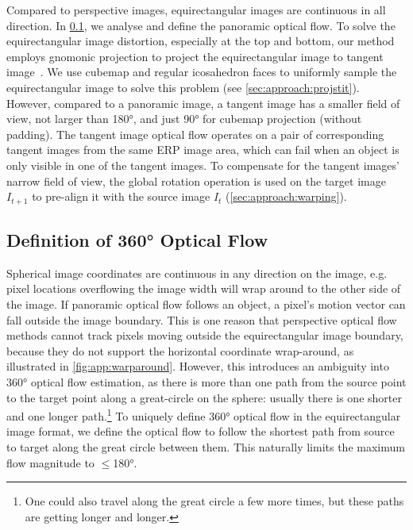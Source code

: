 Compared to perspective images, equirectangular images are continuous in all direction.
In \cref{sec:approach:definition}, we analyse and define the panoramic optical flow.
%
To solve the equirectangular image distortion, especially at the top and bottom, our method employs gnomonic projection to project the equirectangular image to tangent image~\cite{EderSLF2020}.
We use cubemap and regular icosahedron faces to uniformly sample the equirectangular image to solve this problem (see \cref{sec:approach:projstit}).
%
However, compared to a panoramic image, a tangent image has a smaller field of view, not larger than 180°, and just 90° for cubemap projection (without padding).
The tangent image optical flow operates on a pair of corresponding  tangent images from the same ERP image area,
%
which can fail when an object is only visible in one of the tangent images.
%
To compensate for the tangent images' narrow field of view, the global rotation operation is used on the target image $I_{t+1}$ to pre-align it with the source image $I_t$ (\cref{sec:approach:warping}).


\subsection{Definition of 360° Optical Flow}
\label{sec:approach:definition}

Spherical image coordinates are continuous in any direction on the image, e.g. pixel locations overflowing the image width will wrap around to the other side of the image.
%
If panoramic optical flow follows an object, a pixel's motion vector can fall outside the image boundary.
This is one reason that perspective optical flow methods cannot track pixels moving outside the equirectangular image boundary, because they do not support the horizontal coordinate wrap-around, as illustrated in \cref{fig:app:warparound}.
%
However, this introduces an ambiguity into 360° optical flow estimation, 
as there is more than one path from the source point to the target point along a great-circle on the sphere:
usually there is one shorter and one longer path.\footnote{One could also travel along the great circle a few more times, but these paths are getting longer and longer.}
%
To uniquely define 360° optical flow in the equirectangular image format, we define the optical flow to follow the shortest path from source to target along the great circle between them.
%
This naturally limits the maximum flow magnitude to $\leq$180°.


